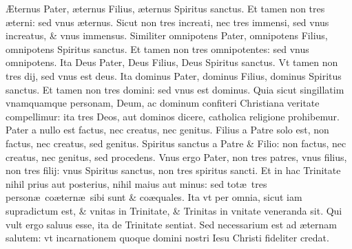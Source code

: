 \documentclass[a5paper,10pt]{book}
\def\ae{æ}
\def\AE{Æ}
\begin{document}
\begin{multicols*}{2}
\newline \color{red} \AE \color{black}ternus Pater, \ae ternus Filius, \ae ternus Spiritus sanctus.
\newline \color{red} E\color{black}t tamen non tres \ae terni: sed vnus \ae ternus.
\newline \color{red} S\color{black}icut non tres increati, nec tres immensi, sed vnus increatus, \& vnus immensus.
\newline \color{red} S\color{black}imiliter omnipotens Pater, omnipotens Filius, omnipotens Spiritus sanctus.
\newline \color{red} E\color{black}t tamen non tres omnipotentes: sed vnus omnipotens.
\newline \color{red} I\color{black}ta Deus Pater, Deus Filius, Deus Spiritus sanctus.
\newline \color{red} V\color{black}t tamen non tres dij, sed vnus est deus.
\newline \color{red} I\color{black}ta dominus Pater, dominus Filius, dominus Spiritus sanctus.
\newline \color{red} E\color{black}t tamen non tres domini: sed vnus est dominus.
\newline \color{red} Q\color{black}uia sicut singillatim vnamquamque personam, Deum, ac dominum confiteri Christiana veritate compellimur: ita tres Deos, aut dominos dicere, catholica religione prohibemur.%
\newline \color{red} P\color{black}ater a nullo est factus, nec creatus, nec genitus.
\newline \color{red} F\color{black}ilius a Patre solo est, non factus, nec creatus, sed genitus.
\newline \color{red} S\color{black}piritus sanctus a Patre \& Filio: non factus, nec creatus, nec genitus, sed procedens.
\newline \color{red} V\color{black}nus ergo Pater, non tres patres, vnus filius, non tres filij: vnus Spiritus sanctus, non tres spiritus sancti.
\newline \color{red} E\color{black}t in hac Trinitate nihil prius aut posterius, nihil maius aut minus: sed tot\ae \ tres person\ae \ co\ae tern\ae \ sibi sunt \& co\ae quales.
\newline \color{red} I\color{black}ta vt per omnia, sicut iam supradictum est, \& vnitas in Trinitate, \& Trinitas in vnitate veneranda sit.
\newline \color{red} Q\color{black}ui vult ergo saluus esse, ita de Trinitate sentiat.
\newline \color{red} S\color{black}ed necessarium est ad \ae ternam salutem: vt incarnationem quoque domini nostri Iesu Christi fideliter credat.

\end{multicols*}
\end{document}
